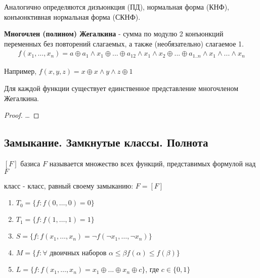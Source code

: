\documentclass[a4paper, 14pt]{article}
\begin{document}
    Аналогично определяются { дизъюнкция} (ПД), { нормальная форма} (КНФ),
    { конъюнктивная нормальная форма} (СКНФ).

    \begin{definition}
        {\bf Многочлен (полином) Жегалкина} - сумма по модулю 2 конъюнкций переменных
        без повторений слагаемых, а также (необязательно) слагаемое 1.
        \begin{align*}
            f(x_1, ..., x_n) = a \oplus a_1 \wedge x_1 \oplus ... \oplus 
            a_{12} \wedge x_1 \wedge x_2 
            \oplus ... \oplus a_{1..n} \wedge x_1 \wedge ... \wedge x_n
        \end{align*}
    \end{definition}

    Например, $f(x, y, z) = x \oplus x \wedge y \wedge z \oplus 1$ 

    \begin{theorem}
        Для каждой функции существует единственное представление многочленом Жегалкина.
    \end{theorem}
    \begin{proof}[Proof]
        \dots
    \end{proof}
    
    \subsection{Замыкание. Замкнутые классы. Полнота}
    
    \begin{definition}
        { $[F]$} базиса $F$ называется множество всех
        функций, представимых формулой над $F$
    \end{definition}
    \begin{definition}
        { класс} - класс, равный своему замыканию: $F = [F]$
    \end{definition}

    \begin{enumerate}
        \item $T_0 = \{f : f(0, \dots, 0) = 0\}$
        \item $T_1 = \{f : f(1, \dots, 1) = 1\}$
        \item $S = \{f : f(x_1, \dots, x_n) = \lnot f(\lnot x_1, \dots, \lnot x_n)\}$
        \item $M = \{f : \forall \text{ двоичных наборов } \alpha \leq \beta
        f(\alpha) \leq f(\beta)\}$
        \item $L = \{f: f(x_1, \dots, x_n) = x_1 \oplus ... \oplus x_n \oplus c\}$, где $c \in \{0, 1\}$
    \end{enumerate}
    
\end{document}
